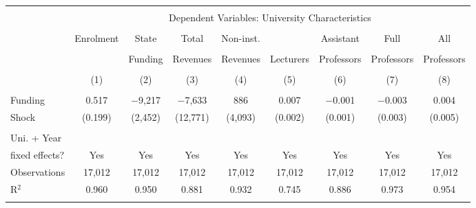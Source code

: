 
\begin{tabular}{@{\extracolsep{5pt}}lcccccccc} 
\\[-1.8ex]\hline 
\hline \\[-1.8ex] 
 & \multicolumn{8}{c}{Dependent Variables: University Characteristics} \\ 
\cline{2-9}
\\[-1.8ex] & Enrolment & State & Total & Non-inst. &   & Assistant & Full & All \\ 
\\[-1.8ex] &           & Funding & Revenues & Revenues & Lecturers & Professors & Professors & Professors \\
\\[-1.8ex] & (1) & (2) & (3) & (4) & (5) & (6) & (7) & (8)\\ 
\hline \\[-1.8ex] 
 Funding & 0.517   & $-$9,217 & $-$7,633 & 886 & 0.007 & $-$0.001 & $-$0.003 & 0.004 \\ 
 Shock   & (0.199) & (2,452) & (12,771) & (4,093) & (0.002) & (0.001) & (0.003) & (0.005) \\ 
 \hline \\[-1.8ex] 
Uni. + Year \\
fixed effects? & Yes & Yes & Yes & Yes & Yes & Yes & Yes & Yes \\
Observations & 17,012 & 17,012 & 17,012 & 17,012 & 17,012 & 17,012 & 17,012 & 17,012 \\ 
R$^{2}$ & 0.960 & 0.950 & 0.881 & 0.932 & 0.745 & 0.886 & 0.973 & 0.954 \\ 
\hline 
\hline \\[-1.8ex] 
\end{tabular} 
